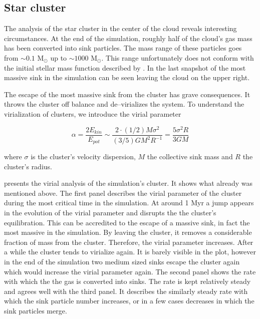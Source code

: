 \subsection{Star cluster}
\label{subsec:Star_cluster}

The analysis of the star cluster in the center of the cloud reveals interesting circumstances.
At the end of the simulation, roughly half of the cloud's gas mass has been converted into sink particles.
The mass range of these particles goes from $\sim0.1$ M$_{\odot}$ up to $\sim1000$ M$_{\odot}$.
This range unfortunately does not conform with the initial stellar mass function described by \citet{Charbier, Kroupa}.
In the last snapshot of  the most massive sink in the simulation can be seen leaving the cloud on the upper right.

The escape of the most massive sink from the cluster has grave consequences.
It throws the cluster off balance and de--virializes the system.
To understand the virialization of clusters, we introduce the virial parameter

\begin{equation}
  \alpha = \frac{2 E_{kin}}{E_{pot}} \sim \frac{2\cdot(1/2)M\sigma^{2}}{(3/5)GM^{2}R^{-1}} = \frac{5\sigma^{2}R}{3GM}
\end{equation}

where $\sigma$ is the cluster's velocity dispersion, $M$ the collective sink mass and $R$ the cluster's radius.

 presents the virial analysis of the simulation's cluster.
It shows what already was mentioned above.
The first panel describes the virial parameter of the cluster during the most critical time in the simulation.
At around 1 Myr a jump appears in the evolution of the virial parameter and disrupts the the cluster's equilibration.
This can be accredited to the escape of a massive sink, in fact the most massive in the simulation.
By leaving the cluster, it removes a considerable fraction of mass from the cluster.
Therefore, the virial parameter increases.
After a while the cluster tends to virialize again.
It is barely visible in the plot, however in the end of the simulation two medium sized sinks escape the cluster again which would increase the virial parameter again.
The second panel shows the rate with which the the gas is converted into sinks.
The rate is kept relatively steady and agrees well with the third panel.
It describes the similarly steady rate with which the sink particle number increases, or in a few cases decreases in which the sink particles merge.

